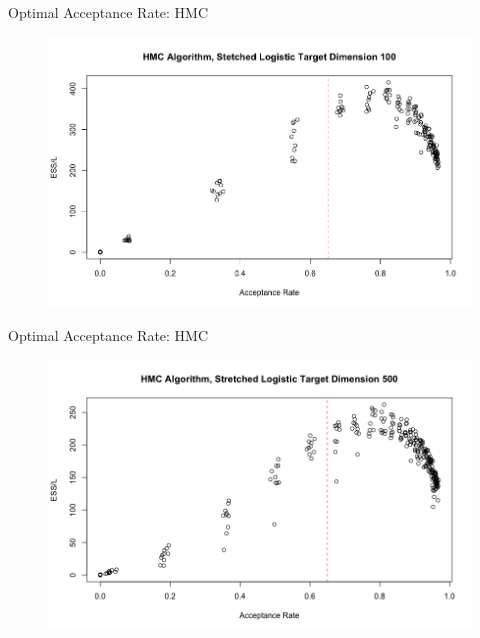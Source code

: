 \documentclass{beamer}
\begin{document}
\begin{frame}{Optimal Acceptance Rate: HMC}

\begin{figure}
\centering
\includegraphics[scale = 0.3]{HMC_Optimal100.png}
\end{figure}

\end{frame}


\begin{frame}{Optimal Acceptance Rate: HMC}
\begin{figure}
\centering
\includegraphics[scale = 0.3]{HMC_Optimal500.png}
\end{figure}
\end{frame}

\end{document}
